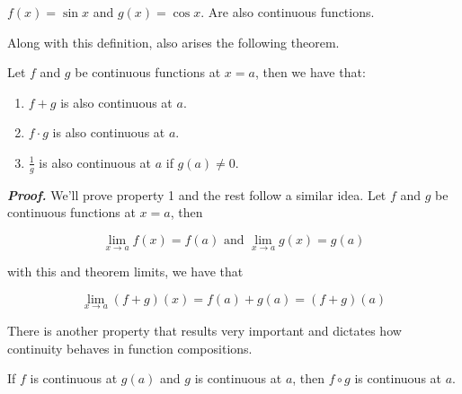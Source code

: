 \documentclass{report}
\begin{document}
\begin{Example}
    $f(x) = \sin x$ and $g(x) = \cos x$. Are also continuous functions.
\end{Example}

Along with this definition, also arises the following theorem.\\

\begin{thBox}
    Let $f$ and $g$ be continuous functions at $x=a$, then we have that:

    \begin{enumerate}
        \item $f+g$ is also continuous at $a$.
        \item $f\cdot g$ is also continuous at $a$.
        \item $\frac{1}{g}$ is also continuous at $a$ if $g(a) \not = 0$.
    \end{enumerate}
\end{thBox}

\textit{\textbf{Proof.}} We'll prove property 1 and the rest follow a similar idea. Let $f$ and $g$ be continuous functions at $x=a$, then

$$
    \lim_{x\to a} f(x) = f(a) \text{ and } \lim_{x\to a} g(x) = g(a)
$$

with this and theorem limits, we have that

$$
    \lim_{x \to a} (f+g)(x) = f(a) + g(a) = (f+g)(a)
$$

There is another property that results very important and dictates how continuity behaves in function compositions.\\

\begin{thBox}
    If $f$ is continuous at $g(a)$ and $g$ is continuous at $a$, then $f \circ g$ is continuous at $a$.
\end{thBox}
\end{document}
